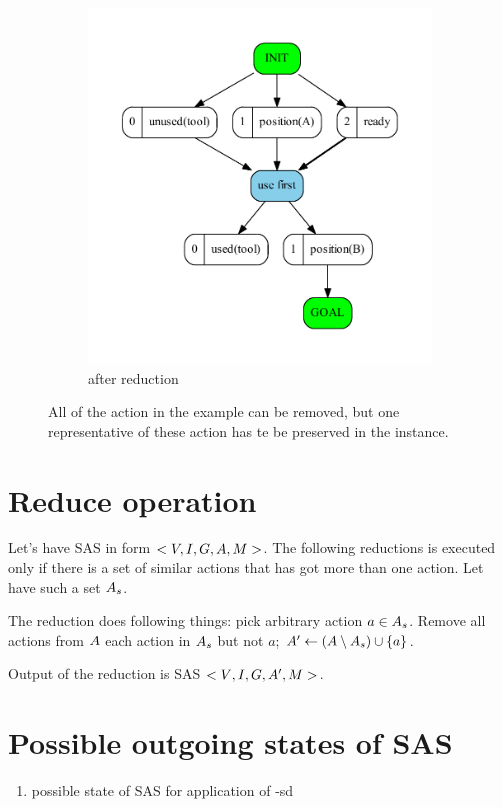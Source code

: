 \begin{figure}
\begin{subfigure}[b]{0.4\textwidth}
			\includegraphics[scale=0.4]{mergingSimilarOperators/figures/threeToOne_output}
			\caption{after reduction}
		\end{subfigure}
		\caption{All of the action in the example can be removed, but one representative of these action has te be preserved in the instance.}		
	\end{figure}	
	
	
	\section{Reduce operation}
	Let's have SAS in form $<V, I, G, A, M{}>$. The following reductions is executed only if there is a set of similar actions that has got more than one action. Let have such a set $A{}_s$.
	
	The reduction does following things: pick arbitrary action $a \in A{}_s$. Remove all actions from $A{}$ each action in $A{}_s$ but not $a$; $A{}' \leftarrow (A \setminus A{}_s) \cup \{a\}$.
	
	Output of the reduction is SAS $<V{}, I{}, G{}, A{}', M{}>$.
	
	\section{Possible outgoing states of SAS}
	\begin{enumerate}
		\item possible state of SAS for application of -sd
	\end{enumerate}
	
